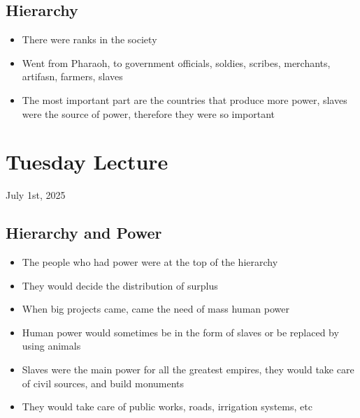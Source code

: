 \documentclass{article}
\begin{document}
\subsection{Hierarchy}
\begin{itemize}
  \item There were ranks in the society
  \item Went from Pharaoh, to government officials,
    soldies, scribes, merchants, artifasn, farmers, slaves
  \item The most important part are the countries that produce more power,
    slaves were the source of power, therefore they were so important
\end{itemize}

\section{Tuesday Lecture}
July 1st, 2025

\subsection{Hierarchy and Power}
\begin{itemize}
  \item The people who had power were at the top of the hierarchy
  \item They would decide the distribution of surplus
\end{itemize}

\begin{itemize}
  \item When big projects came, came the need of mass human power
  \item Human power would sometimes be in the form of slaves
    or be replaced by using animals
  \item Slaves were the main power for all the greatest empires, they
    would take care of civil sources, and build monuments
  \item They would take care of public works, roads,  irrigation systems, etc
\end{itemize}
\end{document}
